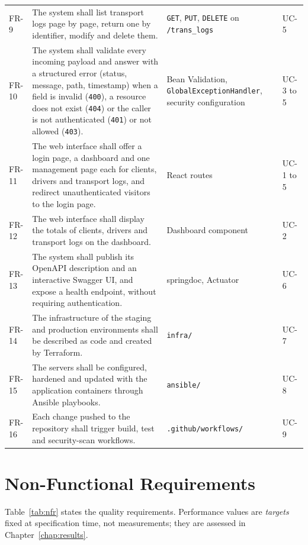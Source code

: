 {\begin{longtable}{@{}p{1.1cm}>{\raggedright\arraybackslash}p{7.4cm}>{\raggedright\arraybackslash}p{4.2cm}p{1.5cm}@{}}
FR-9 & The system shall list transport logs page by page, return one by identifier, modify and delete them. & \texttt{GET}, \texttt{PUT}, \texttt{DELETE} on \texttt{/trans\_logs} & UC-5 \\
FR-10 & The system shall validate every incoming payload and answer with a structured error (status, message, path, timestamp) when a field is invalid (\texttt{400}), a resource does not exist (\texttt{404}) or the caller is not authenticated (\texttt{401}) or not allowed (\texttt{403}). & Bean Validation, \texttt{Global\-Exception\-Handler}, security configuration & UC-3 to 5 \\
FR-11 & The web interface shall offer a login page, a dashboard and one management page each for clients, drivers and transport logs, and redirect unauthenticated visitors to the login page. & React routes & UC-1 to 5 \\
FR-12 & The web interface shall display the totals of clients, drivers and transport logs on the dashboard. & Dashboard component & UC-2 \\
FR-13 & The system shall publish its OpenAPI description and an interactive Swagger UI, and expose a health endpoint, without requiring authentication. & springdoc, Actuator & UC-6 \\
FR-14 & The infrastructure of the staging and production environments shall be described as code and created by Terraform. & \texttt{infra/} & UC-7 \\
FR-15 & The servers shall be configured, hardened and updated with the application containers through Ansible playbooks. & \texttt{ansible/} & UC-8 \\
FR-16 & Each change pushed to the repository shall trigger build, test and security-scan workflows. & \texttt{.github/workflows/} & UC-9 \\
\end{longtable}
}

\section{Non-Functional Requirements}

Table~\ref{tab:nfr} states the quality requirements. Performance values are \emph{targets} fixed at specification time, not measurements; they are assessed in Chapter~\ref{chap:results}.

